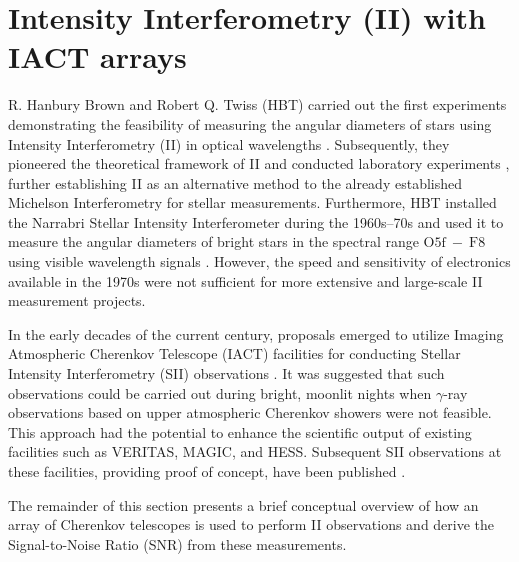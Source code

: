 \section{Intensity Interferometry (II) with IACT arrays}
R. Hanbury Brown and Robert Q. Twiss (HBT) carried out the first experiments demonstrating the feasibility of measuring the angular diameters of stars using Intensity Interferometry (II) in optical wavelengths \citep{HBT56}. Subsequently, they pioneered the theoretical framework of II and conducted laboratory experiments \citep{brown1957interferometry,brown1958interferometry}, further establishing II as an alternative method to the already established Michelson Interferometry for stellar measurements. Furthermore, HBT installed the Narrabri Stellar Intensity Interferometer during the 1960s–70s and used it to measure the angular diameters of bright stars in the spectral range $\mathrm{O5f}\ -\ \mathrm{F8}$ using visible wavelength signals \citep{brown1974intensity}. However, the speed and sensitivity of electronics available in the 1970s were not sufficient for more extensive and large-scale II measurement projects.

In the early decades of the current century, proposals emerged to utilize Imaging Atmospheric Cherenkov Telescope (IACT) facilities for conducting Stellar Intensity Interferometry (SII) observations \citep{LeBohec2006, nunez2010stellar, nunez2012high, Dravins2013}. It was suggested that such observations could be carried out during bright, moonlit nights when $\gamma$-ray observations based on upper atmospheric Cherenkov showers were not feasible. This approach had the potential to enhance the scientific output of existing facilities such as VERITAS, MAGIC, and HESS. Subsequent SII observations at these facilities, providing proof of concept, have been published \citep{abeysekara2020demonstration, Abe2024MAGIC, Zmija2023}.

The remainder of this section presents a brief conceptual overview of how an array of Cherenkov telescopes is used to perform II observations and derive the Signal-to-Noise Ratio (SNR) from these measurements.

